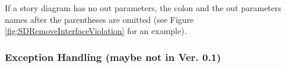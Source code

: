 If a story diagram has no out parameters, the colon and the out parameters names after the parentheses are omitted (see Figure \ref{fig:SDRemoveInterfaceViolation} for an example).


\subsubsection{Exception Handling (maybe not in Ver. 0.1)}